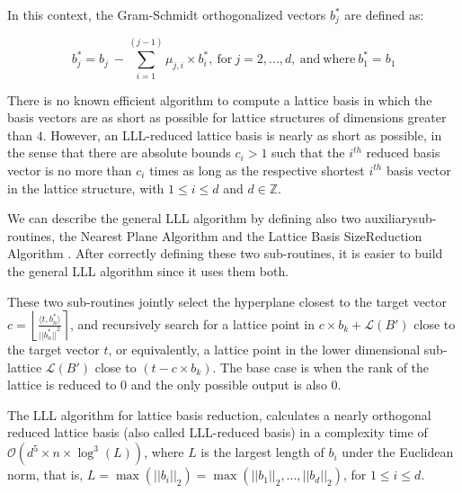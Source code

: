 \documentclass[runningheads]{llncs}
\numberwithin{equation}{section}
\begin{document}
\begin{enumerate}
        \vspace{2ex}
        
        In this context, the Gram-Schmidt orthogonalized vectors ${b}^{*}_{j}$ are defined as:
        
        $$ {b}^{*}_{j} = {b}_{j}\ - \sum_{i = 1}^{(j - 1)} {\mu}_{j,i} \times {b}^{*}_{i},\ \mathrm{for}\ j = 2, ..., d,\ \mathrm{and\ where}\ {b}^{*}_{1} = {b}_{1} $$

        \vspace{2ex}
        
        There is no known efficient algorithm to compute a lattice basis in which the basis vectors are as short as possible for lattice structures of dimensions greater than $4$. However, an LLL-reduced lattice basis is nearly as short as possible, in the sense that there are absolute bounds ${c}_{i} > 1$ such that the ${i}^{th}$ reduced basis vector is no more than ${c}_{i}$ times as long as the respective shortest ${i}^{th}$ basis vector in the lattice structure, with $1 \leq i \leq d$ and $d \in \mathbb{Z}$.

        We can describe the general LLL algorithm by defining also two auxiliary\break sub-routines, the Nearest Plane Algorithm \cite{babai:lovasz-lattice-reduction-and-nearest-lattice-point-problem:1986:06-2024} and the Lattice Basis Size\break Reduction Algorithm \cite{lenstra-lenstra-lovasz:factoring-polynomials-with-rational-coefficients:1982:06-2024}. After correctly defining these two sub-routines, it is easier to build the general LLL algorithm since it uses them both.

        These two sub-routines jointly select the hyperplane closest to the target vector $c = \left\lfloor \frac{ \langle t, {b}^{*}_{n} \rangle }{ {|| {b}^{*}_{n} ||}^{2} } \right\rceil$, and recursively search for a lattice point in $c \times {b}_{k} + \mathcal{L}(B')$ close to the target vector $t$, or equivalently, a lattice point in the lower dimensional sub-lattice $\mathcal{L}(B')$ close to $(t - c \times {b}_{k})$. The base case is when the rank of the lattice is reduced to $0$ and the only possible output is also $0$.

        The LLL algorithm for lattice basis reduction, calculates a nearly orthogonal reduced lattice basis (also called LLL-reduced basis) in a complexity time of $\mathcal{O}\left({d}^{5} \times n \times \log^{3}(L)\right)$, where $L$ is the largest length of ${b}_{i}$ under the Euclidean norm, that is, $L = \max\left( {||{b}_{i}||}_{2} \right) = \max\left( {||{b}_{1}||}_{2}, ..., {||{b}_{d}||}_{2} \right)$, for $1 \leq i \leq d$.


\end{enumerate}
\end{document}
